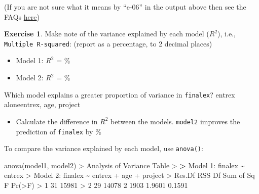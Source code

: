 \documentclass[
]{book}
\newenvironment{Shaded}{\begin{snugshade}}{\end{snugshade}}
\newcommand{\DecValTok}[1]{\textcolor[rgb]{0.00,0.00,0.81}{#1}}
\newcommand{\ErrorTok}[1]{\textcolor[rgb]{0.64,0.00,0.00}{\textbf{#1}}}
\newcommand{\FloatTok}[1]{\textcolor[rgb]{0.00,0.00,0.81}{#1}}
\newcommand{\FunctionTok}[1]{\textcolor[rgb]{0.00,0.00,0.00}{#1}}
\newcommand{\NormalTok}[1]{#1}
\newcommand{\SpecialCharTok}[1]{\textcolor[rgb]{0.00,0.00,0.00}{#1}}
\providecommand{\tightlist}{%
  \setlength{\itemsep}{0pt}\setlength{\parskip}{0pt}}
\theoremstyle{definition}
\theoremstyle{definition}
\theoremstyle{definition}
\newtheorem{exercise}{Exercise}[chapter]
\theoremstyle{definition}
\theoremstyle{remark}
\begin{document}
\hfill\break
(If you are not sure what it means by ``e-06'' in the output above then see the FAQs \protect\hyperlink{e-meaning}{here})

\begin{exercise}

Make note of the variance explained by each model (\(R^2\)), i.e., \texttt{Multiple\ R-squared}: (report as a percentage, to 2 decimal places)

\begin{itemize}
\item
  Model 1: \(R^2\) = \%
\item
  Model 2: \(R^2\) = \%
\end{itemize}

Which model explains a greater proportion of variance in \texttt{finalex}? entrex aloneentrex, age, project

\begin{itemize}
\tightlist
\item
  Calculate the difference in \(R^2\) between the models. \texttt{model2} improves the prediction of \texttt{finalex} by \%
\end{itemize}

\end{exercise}

\hfill\break
To compare the variance explained by each model, use \texttt{anova()}:

\begin{Shaded}
\begin{Highlighting}[]
\FunctionTok{anova}\NormalTok{(model1, model2)}
\SpecialCharTok{\textgreater{}}\NormalTok{ Analysis of Variance Table}
\SpecialCharTok{\textgreater{}} 
\ErrorTok{\textgreater{}}\NormalTok{ Model }\DecValTok{1}\SpecialCharTok{:}\NormalTok{ finalex }\SpecialCharTok{\textasciitilde{}}\NormalTok{ entrex}
\SpecialCharTok{\textgreater{}}\NormalTok{ Model }\DecValTok{2}\SpecialCharTok{:}\NormalTok{ finalex }\SpecialCharTok{\textasciitilde{}}\NormalTok{ entrex }\SpecialCharTok{+}\NormalTok{ age }\SpecialCharTok{+}\NormalTok{ project}
\SpecialCharTok{\textgreater{}}\NormalTok{   Res.Df   RSS Df Sum of Sq      F }\FunctionTok{Pr}\NormalTok{(}\SpecialCharTok{\textgreater{}}\NormalTok{F)}
\SpecialCharTok{\textgreater{}} \DecValTok{1}     \DecValTok{31} \DecValTok{15981}                           
\SpecialCharTok{\textgreater{}} \DecValTok{2}     \DecValTok{29} \DecValTok{14078}  \DecValTok{2}      \DecValTok{1903} \FloatTok{1.9601} \FloatTok{0.1591}
\end{Highlighting}
\end{Shaded}
\end{document}
